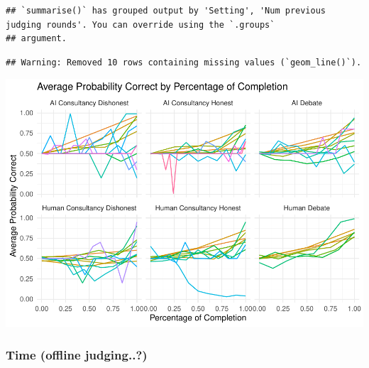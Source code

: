 \documentclass[
]{article}
\begin{document}
\begin{verbatim}
## `summarise()` has grouped output by 'Setting', 'Num previous judging rounds'. You can override using the `.groups`
## argument.
\end{verbatim}

\begin{verbatim}
## Warning: Removed 10 rows containing missing values (`geom_line()`).
\end{verbatim}

\includegraphics{debate-2309_files/figure-latex/strat ggplot-14.pdf}

\subsubsection{Time (offline judging..?)}\label{time-offline-judging..}
\end{document}

